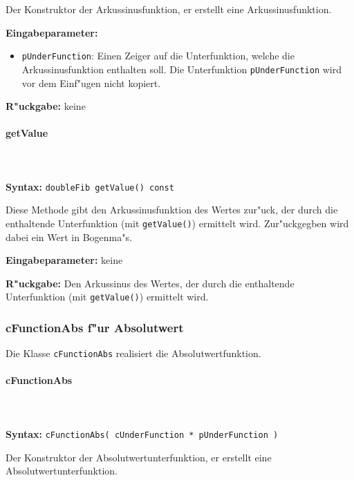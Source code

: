 \bigskip\noindent
Der Konstruktor der Arkussinusfunktion, er erstellt eine Arkussinusfunktion.

\bigskip\noindent
\textbf{Eingabeparameter:}
\begin{itemize}
 \item \verb|pUnderFunction|: Einen Zeiger auf die Unterfunktion, welche die Arkussinusfunktion enthalten soll. Die Unterfunktion \verb|pUnderFunction| wird vor dem Einf"ugen nicht kopiert.
\end{itemize}

\bigskip\noindent
\textbf{R"uckgabe:} keine


\paragraph{getValue}

\ \\\\\noindent
\textbf{Syntax:} \verb|doubleFib getValue() const|

\bigskip\noindent
Diese Methode gibt den Arkussinusfunktion des Wertes zur"uck, der durch die enthaltende Unterfunktion (mit \verb|getValue()|) ermittelt wird. 
Zur"uckgegben wird dabei ein Wert in Bogenma"s.

\bigskip\noindent
\textbf{Eingabeparameter:} keine

\bigskip\noindent
\textbf{R"uckgabe:} Den Arkussinus des Wertes, der durch die enthaltende Unterfunktion (mit \verb|getValue()|) ermittelt wird.


\subsubsection{cFunctionAbs f"ur Absolutwert}

Die Klasse \verb|cFunctionAbs| realisiert die Absolutwertfunktion.

\paragraph{cFunctionAbs}

\ \\\\\noindent
\textbf{Syntax:} \verb|cFunctionAbs( cUnderFunction * pUnderFunction )|

\bigskip\noindent
Der Konstruktor der Absolutwertunterfunktion, er erstellt eine Absolutwertunterfunktion.

